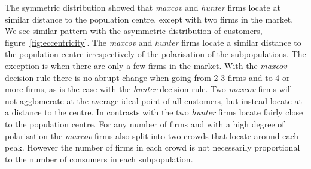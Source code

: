 \documentclass[preprint, 12pt]{elsarticle}
\begin{document}
The symmetric distribution showed that \emph{maxcov} and \emph{hunter} firms locate at similar distance to the population centre, except with two firms in the market. We see similar pattern with the asymmetric distribution of customers, figure~\ref{fig:eccentricity}. The \emph{maxcov} and \emph{hunter} firms locate a similar distance to the population centre irrespectively of the polarisation of the subpopulations. The exception is when there are only a few firms in the market. With the \emph{maxcov} decision rule there is no abrupt change when going from 2-3 firms and to 4 or more firms, as is the case with the \emph{hunter} decision rule. Two \emph{maxcov} firms will not agglomerate at the average ideal point of all customers, but instead locate at a distance to the centre. In contrasts with the two \emph{hunter} firms locate fairly close to the population centre. For any number of firms and with a high degree of polarisation the \emph{maxcov} firms also split into two crowds that locate around each peak. However the number of firms in each crowd is not necessarily proportional to the number of consumers in each subpopulation.
\end{document}
